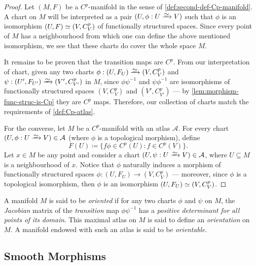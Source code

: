 \begin{proof}
Let \((M, F)\) be a \(C^p\)-manifold in the sense of
\cref{def:second-def-Cp-manifold}. A chart on \(M\) will be interpreted as a
pair \((U, \phi: U \isoto V)\) such that \(\phi\) is an isomorphism
\((U, F) \simeq (V, C_V^p)\) of functionally structured spaces. Since every point
of \(M\) has a neighbourhood from which one can define the above mentioned
isomorphism, we see that these charts do cover the whole space \(M\).

It remains to be proven that the transition maps are \(C^p\). From our
interpretation of chart, given any two charts
\(\phi: (U, F_U) \isoto (V, C_V^p)\) and
\(\psi: (U', F_{U'}) \isoto (V', C_{V'}^p)\) in \(M\), since \(\phi \psi^{-1}\)
and \(\psi \phi^{-1}\) are isomorphisms of functionally structured spaces
\((V, C_V^p)\) and \((V', C_{V'}^p)\) --- by \cref{lem:morphism-func-struc-is-Cp}
they are \(C^p\) maps. Therefore, our collection of charts match the
requirements of \cref{def:Cp-atlas}.

For the converse, let \(M\) be a \(C^p\)-manifold with an atlas
\(\mathcal{A}\). For every chart \((U, \phi: U \isoto V) \in \mathcal{A}\)
(where \(\phi\) is a topological morphism), define
\[
F(U) \coloneq \{f \phi \in C^{p}(U) \colon f \in C^p(V)\}.
\]
Let \(x \in M\) be any point and consider a chart \((U, \psi: U \isoto V)
\in \mathcal{A}\), where \(U \subseteq M\) is a neighbourhood of \(x\). Notice
that \(\phi\) naturally induces a morphism of functionally structured spaces
\(\phi: (U, F_U) \to (V, C_V^p)\) --- moreover, since \(\phi\) is a topological
isomorphism, then \(\phi\) is an isomorphism \((U, F_U) \simeq (V, C_V^p)\).
\end{proof}

\begin{definition}[Orientation]
\label{def:orientation-manifold}
A manifold \(M\) is said to be \emph{oriented} if for any two charts \(\phi\)
and \(\psi\) on \(M\), the \emph{Jacobian} matrix of the \emph{transition} map
\(\phi \psi^{-1}\) has a \emph{positive determinant for all points of its
  domain}. This maximal atlas on \(M\) is said to define an \emph{orientation}
on \(M\). A manifold endowed with such an atlas is said to be \emph{orientable}.
\end{definition}

\subsection{Smooth Morphisms}

